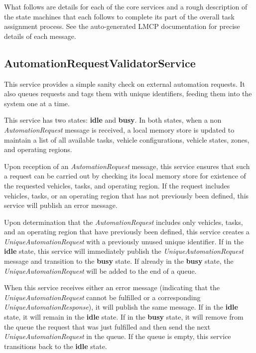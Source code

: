 What follows are details for each of the core services and a rough description of the state machines
that each follows to complete its part of the overall task assignment process. See the auto-generated
LMCP documentation for precise details of each message.

\subsection{AutomationRequestValidatorService}\label{automationrequestvalidatorservice}

This service provides a simple sanity check on external automation
requests. It also queues requests and tags them with unique identifiers,
feeding them into the system one at a time.

This service has two states: \textbf{idle} and \textbf{busy}. In both
states, when a non \emph{AutomationRequest} message is received, a local
memory store is updated to maintain a list of all available tasks,
vehicle configurations, vehicle states, zones, and operating regions.

Upon reception of an \emph{AutomationRequest} message, this service
ensures that such a request can be carried out by checking its local
memory store for existence of the requested vehicles, tasks, and
operating region. If the request includes vehicles, tasks, or an
operating region that has not previously been defined, this service will
publish an error message.

Upon determination that the \emph{AutomationRequest} includes only
vehicles, tasks, and an operating region that have previously been
defined, this service creates a \emph{UniqueAutomationRequest} with a
previously unused unique identifier. If in the \textbf{idle} state, this
service will immediately publish the \emph{UniqueAutomationRequest}
message and transition to the \textbf{busy} state. If already in the
\textbf{busy} state, the \emph{UniqueAutomationRequest} will be added to
the end of a queue.

When this service receives either an error message (indicating that the
\emph{UniqueAutomationRequest} cannot be fulfilled or a corresponding
\emph{UniqueAutomationResponse}), it will publish the same message. If
in the \textbf{idle} state, it will remain in the \textbf{idle} state.
If in the \textbf{busy} state, it will remove from the queue the request
that was just fulfilled and then send the next
\emph{UniqueAutomationRequest} in the queue. If the queue is empty, this
service transitions back to the \textbf{idle} state.

